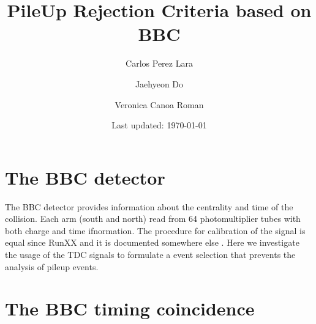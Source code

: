 \documentclass{article}
\title{PileUp Rejection Criteria based on BBC}
\author{Carlos Perez Lara\and Jaehyeon Do \and Veronica Canoa Roman}
\date{Last updated: \today}
\begin{document}
\maketitle

\section{The BBC detector}
The BBC detector provides information about the centrality and time of the collision.
Each arm (south and north) read from 64 photomultiplier tubes with both charge and time ifnormation.
The procedure for calibration of the signal is equal since RunXX and it is documented somewhere else \cite{A}.
Here we investigate the usage of the TDC signals to formulate a event selection that prevents the analysis of pileup events.

\section{The BBC timing coincidence}
\end{document}
